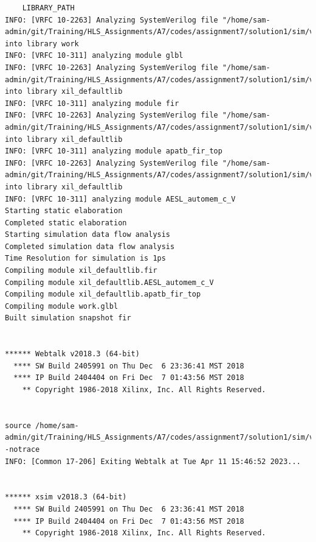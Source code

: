 \documentclass{article}
\begin{document}
\begin{lstlisting}
    LIBRARY_PATH
INFO: [VRFC 10-2263] Analyzing SystemVerilog file "/home/sam-admin/git/Training/HLS_Assignments/A7/codes/assignment7/solution1/sim/verilog/glbl.v" into library work
INFO: [VRFC 10-311] analyzing module glbl
INFO: [VRFC 10-2263] Analyzing SystemVerilog file "/home/sam-admin/git/Training/HLS_Assignments/A7/codes/assignment7/solution1/sim/verilog/fir.v" into library xil_defaultlib
INFO: [VRFC 10-311] analyzing module fir
INFO: [VRFC 10-2263] Analyzing SystemVerilog file "/home/sam-admin/git/Training/HLS_Assignments/A7/codes/assignment7/solution1/sim/verilog/fir.autotb.v" into library xil_defaultlib
INFO: [VRFC 10-311] analyzing module apatb_fir_top
INFO: [VRFC 10-2263] Analyzing SystemVerilog file "/home/sam-admin/git/Training/HLS_Assignments/A7/codes/assignment7/solution1/sim/verilog/AESL_automem_c_V.v" into library xil_defaultlib
INFO: [VRFC 10-311] analyzing module AESL_automem_c_V
Starting static elaboration
Completed static elaboration
Starting simulation data flow analysis
Completed simulation data flow analysis
Time Resolution for simulation is 1ps
Compiling module xil_defaultlib.fir
Compiling module xil_defaultlib.AESL_automem_c_V
Compiling module xil_defaultlib.apatb_fir_top
Compiling module work.glbl
Built simulation snapshot fir


****** Webtalk v2018.3 (64-bit)
  **** SW Build 2405991 on Thu Dec  6 23:36:41 MST 2018
  **** IP Build 2404404 on Fri Dec  7 01:43:56 MST 2018
    ** Copyright 1986-2018 Xilinx, Inc. All Rights Reserved.


source /home/sam-admin/git/Training/HLS_Assignments/A7/codes/assignment7/solution1/sim/verilog/xsim.dir/fir/webtalk/xsim_webtalk.tcl -notrace
INFO: [Common 17-206] Exiting Webtalk at Tue Apr 11 15:46:52 2023...


****** xsim v2018.3 (64-bit)
  **** SW Build 2405991 on Thu Dec  6 23:36:41 MST 2018
  **** IP Build 2404404 on Fri Dec  7 01:43:56 MST 2018
    ** Copyright 1986-2018 Xilinx, Inc. All Rights Reserved.



\end{lstlisting}
\end{document}
